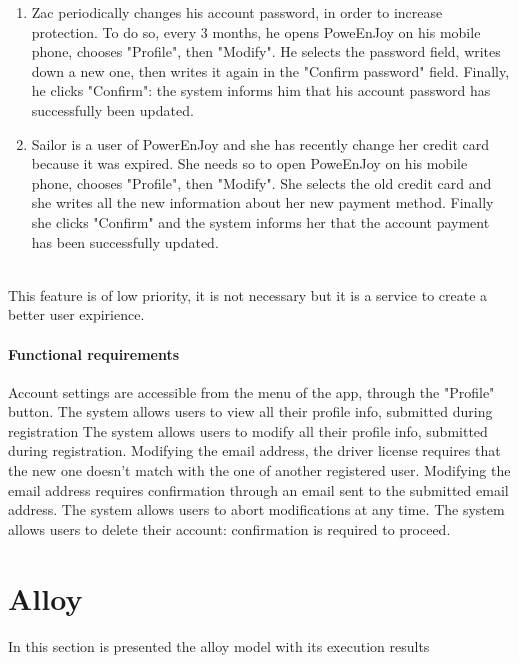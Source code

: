 \begin{enumerate}
	\item  Zac periodically changes his account password, in order to increase protection. To do so, every 3 months, he opens PoweEnJoy on his mobile phone, chooses "Profile", then "Modify". He selects the password field, writes down a new one, then writes it again in the "Confirm password" field. Finally, he clicks "Confirm": the system informs him that his account password has successfully been updated.
	\item Sailor is a user of PowerEnJoy and she has recently change her credit card because it was expired. She needs so to open PoweEnJoy on his mobile phone, chooses "Profile", then "Modify". She selects the old credit card and she writes all the new information about her new payment method. Finally she clicks "Confirm" and the system informs her that the account payment has been successfully updated.
\end{enumerate}
 \ \\
This feature is of low priority, it is not necessary but it is a service to create a better user expirience.
\paragraph{Functional requirements }
\begin{itemize}
	 Account settings are accessible from the menu of the app, through the "Profile" button.
	 The system allows users to view all their profile info, submitted during registration
	 The system allows users to modify all their profile info, submitted during registration.
	 Modifying the email address, the driver license requires that the new one doesn't match with the one of another registered user.
	 Modifying the email address requires confirmation through an email sent to the submitted email address.
	 The system allows users to abort modifications at any time.
	 The system allows users to delete their account: confirmation is required to proceed.
\end{itemize}
\newpage

\section{Alloy}
In this section is presented the alloy model with its execution results
\newpage

